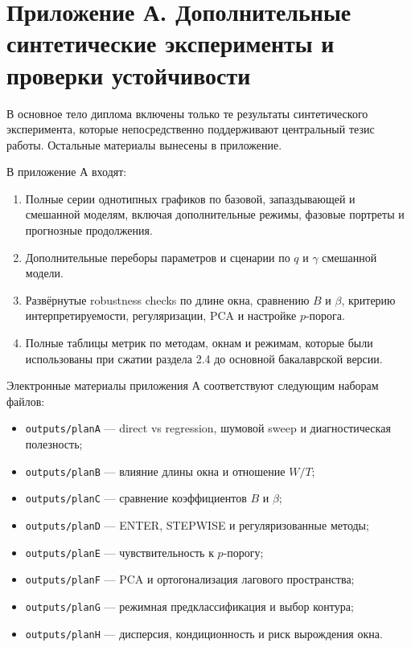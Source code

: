 \chapter{Приложение А. Дополнительные синтетические эксперименты и проверки устойчивости}
\label{app:prilozhenie-a-dopolnitelnye-synthetic-eksperimenty-i-proverki-ustoichivosti}

В основное тело диплома включены только те результаты синтетического эксперимента, которые непосредственно поддерживают центральный тезис работы. Остальные материалы вынесены в приложение.

В приложение А входят:

\begin{enumerate}
\def\labelenumi{\arabic{enumi}.}
\tightlist
\item
  Полные серии однотипных графиков по базовой, запаздывающей и смешанной моделям, включая дополнительные режимы, фазовые портреты и прогнозные продолжения.
\item
  Дополнительные переборы параметров и сценарии по \(q\) и \(\gamma\) смешанной модели.
\item
  Развёрнутые robustness checks по длине окна, сравнению \(B\) и \(\beta\), критерию интерпретируемости, регуляризации, PCA и настройке \(p\)-порога.
\item
  Полные таблицы метрик по методам, окнам и режимам, которые были использованы при сжатии раздела 2.4 до основной бакалаврской версии.
\end{enumerate}

Электронные материалы приложения А соответствуют следующим наборам файлов:

\begin{itemize}
\tightlist
\item
  \texttt{outputs/planA} --- direct vs regression, шумовой sweep и диагностическая полезность;
\item
  \texttt{outputs/planB} --- влияние длины окна и отношение \(W/T\);
\item
  \texttt{outputs/planC} --- сравнение коэффициентов \(B\) и \(\beta\);
\item
  \texttt{outputs/planD} --- ENTER, STEPWISE и регуляризованные методы;
\item
  \texttt{outputs/planE} --- чувствительность к \(p\)-порогу;
\item
  \texttt{outputs/planF} --- PCA и ортогонализация лагового пространства;
\item
  \texttt{outputs/planG} --- режимная предклассификация и выбор контура;
\item
  \texttt{outputs/planH} --- дисперсия, кондиционность и риск вырождения окна.
\end{itemize}
